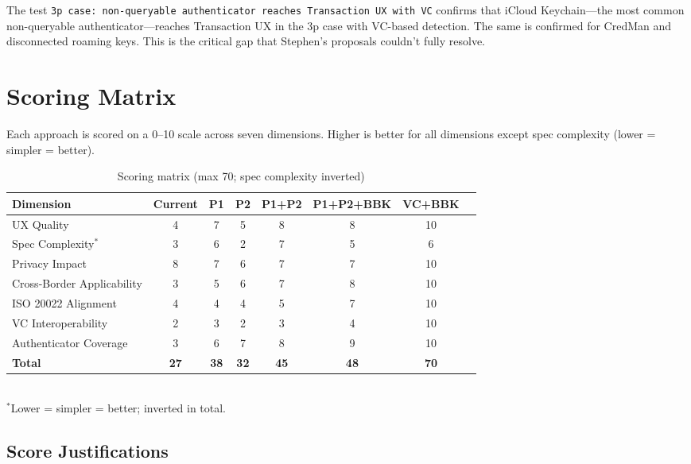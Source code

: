 \documentclass[12pt,a4paper]{article}
\begin{document}
The test \texttt{3p case: non-queryable authenticator reaches Transaction UX with VC} confirms that iCloud Keychain---the most common non-queryable authenticator---reaches Transaction UX in the 3p case with VC-based detection. The same is confirmed for CredMan and disconnected roaming keys. This is the critical gap that Stephen's proposals couldn't fully resolve.

\newpage
\section{Scoring Matrix}

Each approach is scored on a 0--10 scale across seven dimensions. Higher is better for all dimensions except spec complexity (lower = simpler = better).

\begin{table}[h]
\centering
\caption{Scoring matrix (max 70; spec complexity inverted)}
\label{tab:scoring}
\small
\begin{tabularx}{\textwidth}{lccccccc}
\toprule
\textbf{Dimension} & \textbf{Current} & \textbf{P1} & \textbf{P2} & \textbf{P1+P2} & \textbf{P1+P2+BBK} & \textbf{VC+BBK} \\
\midrule
UX Quality & 4 & 7 & 5 & 8 & 8 & 10 \\
Spec Complexity$^*$ & 3 & 6 & 2 & 7 & 5 & 6 \\
Privacy Impact & 8 & 7 & 6 & 7 & 7 & 10 \\
Cross-Border Applicability & 3 & 5 & 6 & 7 & 8 & 10 \\
ISO 20022 Alignment & 4 & 4 & 4 & 5 & 7 & 10 \\
VC Interoperability & 2 & 3 & 2 & 3 & 4 & 10 \\
Authenticator Coverage & 3 & 6 & 7 & 8 & 9 & 10 \\
\midrule
\textbf{Total} & \textbf{27} & \textbf{38} & \textbf{32} & \textbf{45} & \textbf{48} & \textbf{70} \\
\bottomrule
\end{tabularx}
\\[4pt]
\footnotesize $^*$Lower = simpler = better; inverted in total.
\end{table}

\subsection{Score Justifications}
\end{document}
